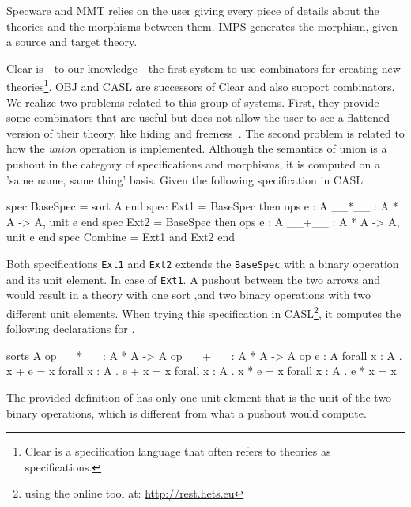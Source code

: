
Specware and MMT relies on the user giving every piece of details about the theories and the morphisms between them. IMPS generates the morphism, given a source and target theory. 

Clear is - to our knowledge - the first system to use combinators for creating new theories\footnote{Clear is a specification language that often refers to theories as specifications.}. OBJ and CASL are successors of Clear and also support combinators. We realize two problems related to this group of systems. First, they provide some combinators that are useful but does not allow the user to see a flattened version of their theory, like hiding and freeness~\cite{CoFI:2004:CASL-RM}. The second problem is related to how the \emph{union} operation is implemented. Although the semantics of union is a pushout in the category of specifications and morphisms, it is computed on a 'same name, same thing' basis. Given the following specification in CASL 
\begin{caslcode}
spec BaseSpec = sort A end 
spec Ext1 = BaseSpec then 
  ops e : A 
  __*__ :  A * A -> A, unit e 
end 
spec Ext2 = BaseSpec then 
  ops e : A 
  __+__ :  A * A -> A, unit e 
end 
spec Combine = Ext1 and Ext2 end
\end{caslcode}
Both specifications \verb|Ext1| and \verb|Ext2| extends the \verb|BaseSpec| with a binary operation and its unit element. In case of \verb|Ext1|. A pushout between the two arrows  and  would result in a theory with one sort ,and  two binary operations with two different unit elements. When trying this specification in CASL\footnote{using the online tool at: \url{http://rest.hets.eu}}, it computes the following declarations for .  
\begin{caslcode}
  sorts A
  op __*__ : A * A -> A
  op __+__ : A * A -> A
  op e : A
  forall x : A . x + e = x %
  forall x : A . e + x = x %
  forall x : A . x * e = x %
  forall x : A . e * x = x %
\end{caslcode} 
The provided definition of  has only one unit element that is the unit of the two binary operations, which is different from what a pushout would compute. 

